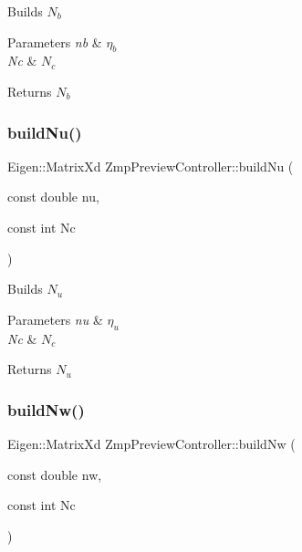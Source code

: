 Builds $N_b$


\begin{DoxyParams}{Parameters}
{\em nb} & $\eta_b$ \\
\hline
{\em Nc} & $N_c$\\
\hline
\end{DoxyParams}
\begin{DoxyReturn}{Returns}
$N_b$ 
\end{DoxyReturn}
\hypertarget{classZmpPreviewController_ad1322ec975c7d022feb24a40fff62f2e}{}\label{classZmpPreviewController_ad1322ec975c7d022feb24a40fff62f2e} 
\subsubsection{\texorpdfstring{build\+Nu()}{buildNu()}}
{\footnotesize\ttfamily Eigen\+::\+Matrix\+Xd Zmp\+Preview\+Controller\+::build\+Nu (\begin{DoxyParamCaption}\item[{const double}]{nu,  }\item[{const int}]{Nc }\end{DoxyParamCaption})}

Builds $N_u$


\begin{DoxyParams}{Parameters}
{\em nu} & $\eta_u$ \\
\hline
{\em Nc} & $N_c$\\
\hline
\end{DoxyParams}
\begin{DoxyReturn}{Returns}
$N_u$ 
\end{DoxyReturn}
\hypertarget{classZmpPreviewController_a96bed83f8441cfbd6d6fbff54c5b530d}{}\label{classZmpPreviewController_a96bed83f8441cfbd6d6fbff54c5b530d} 
\subsubsection{\texorpdfstring{build\+Nw()}{buildNw()}}
{\footnotesize\ttfamily Eigen\+::\+Matrix\+Xd Zmp\+Preview\+Controller\+::build\+Nw (\begin{DoxyParamCaption}\item[{const double}]{nw,  }\item[{const int}]{Nc }\end{DoxyParamCaption})}

